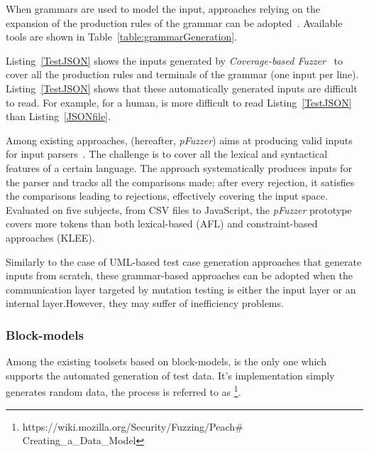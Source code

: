 When grammars are used to model the input,  approaches relying on the expansion of the production rules of the grammar can be adopted~\cite{fuzzingbook2019:GrammarFuzzer}. 
Available tools are shown in Table~\ref{table:grammarGeneration}.

Listing~\ref{TestJSON} shows the inputs generated by \emph{Coverage-based Fuzzer}~\cite{fuzzingbook2019:GrammarFuzzer} to cover all the production rules and terminals of the grammar (one input per line). Listing~\ref{TestJSON} shows that these automatically generated inputs are difficult to read. For example, for a human, is more difficult to  read Listing~\ref{TestJSON}  than Listing~\ref{JSONfile}.





Among existing approaches,  (hereafter, \emph{pFuzzer}) aims at producing valid inputs for input parsers~\cite{mathis2019parser}. The challenge is to cover all the lexical and syntactical features of a certain language. The approach systematically produces inputs for the parser and tracks all the comparisons made; after every rejection, it satisfies the comparisons leading to rejections, effectively covering the input space. 
Evaluated on five subjects, from CSV files to JavaScript, the \emph{pFuzzer} prototype covers more tokens than both lexical-based (AFL) and constraint-based approaches (KLEE).


Similarly to the case of UML-based test case generation approaches that generate inputs from scratch, these grammar-based approaches can be adopted when the communication layer targeted by mutation testing is either the input layer or an internal layer.However, they may suffer of inefficiency problems.


\subsubsection{Block-models}

Among the existing toolsets based on block-models,  is the only one which supports the automated generation of test data. It's implementation simply generates random data, the process is referred to as 
\footnote{https://wiki.mozilla.org/Security/Fuzzing/Peach$\#$Creating\_a\_Data\_Model}.


